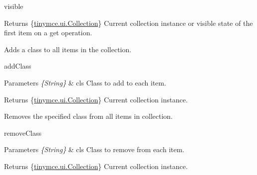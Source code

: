 visible \begin{DoxyReturn}{Returns}
\{\hyperlink{classtinymce_1_1ui_1_1_collection}{tinymce.\+ui.\+Collection}\} Current collection instance or visible state of the first item on a get operation.
\end{DoxyReturn}
Adds a class to all items in the collection.

add\+Class 
\begin{DoxyParams}{Parameters}
{\em \{\+String\}} & cls Class to add to each item. \\
\hline
\end{DoxyParams}
\begin{DoxyReturn}{Returns}
\{\hyperlink{classtinymce_1_1ui_1_1_collection}{tinymce.\+ui.\+Collection}\} Current collection instance.
\end{DoxyReturn}
Removes the specified class from all items in collection.

remove\+Class 
\begin{DoxyParams}{Parameters}
{\em \{\+String\}} & cls Class to remove from each item. \\
\hline
\end{DoxyParams}
\begin{DoxyReturn}{Returns}
\{\hyperlink{classtinymce_1_1ui_1_1_collection}{tinymce.\+ui.\+Collection}\} Current collection instance.
\end{DoxyReturn}

\begin{DoxyCodeInclude}
\end{DoxyCodeInclude}
 